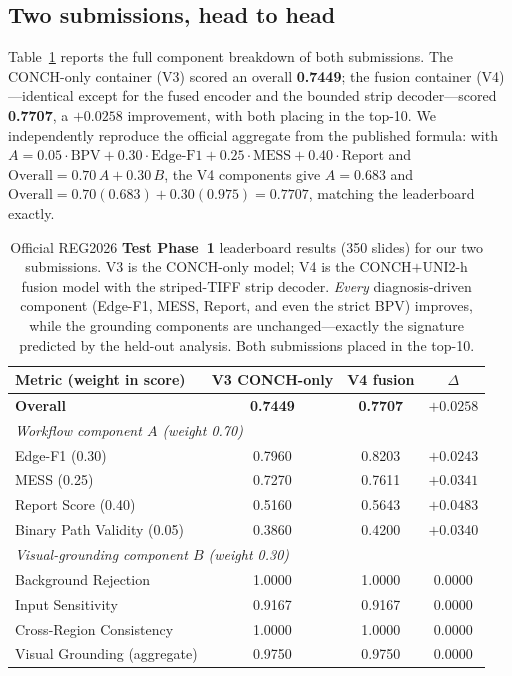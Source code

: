 \documentclass[11pt,a4paper]{article}
\begin{document}
\subsection{Two submissions, head to head}
Table~\ref{tab:testphase} reports the full component breakdown of both submissions. The CONCH-only
container (V3) scored an overall \textbf{0.7449}; the fusion container (V4)---identical except for
the fused encoder and the bounded strip decoder---scored \textbf{0.7707}, a $+0.0258$ improvement,
with both placing in the top-10. We independently reproduce the official aggregate from the
published formula: with $A=0.05\cdot\text{BPV}+0.30\cdot\text{Edge-F1}+0.25\cdot\text{MESS}
+0.40\cdot\text{Report}$ and $\text{Overall}=0.70\,A+0.30\,B$, the V4 components give
$A=0.683$ and $\text{Overall}=0.70(0.683)+0.30(0.975)=0.7707$, matching the leaderboard exactly.

\begin{table}[h]
\centering
\caption{Official REG2026 \textbf{Test Phase~1} leaderboard results (350 slides) for our two
submissions. V3 is the CONCH-only model; V4 is the CONCH$+$UNI2-h fusion model with the striped-TIFF
strip decoder. \emph{Every} diagnosis-driven component (Edge-F1, MESS, Report, and even the strict
BPV) improves, while the grounding components are unchanged---exactly the signature predicted by the
held-out analysis. Both submissions placed in the top-10.}
\label{tab:testphase}
\begin{tabular}{lccc}
\toprule
Metric (weight in score) & V3 CONCH-only & V4 fusion & $\Delta$ \\
\midrule
\textbf{Overall} & \textbf{0.7449} & \textbf{0.7707} & $\mathbf{+0.0258}$ \\
\midrule
\multicolumn{4}{l}{\emph{Workflow component $A$ (weight 0.70)}}\\
\quad Edge-F1 (0.30) & 0.7960 & 0.8203 & $+0.0243$ \\
\quad MESS (0.25)    & 0.7270 & 0.7611 & $+0.0341$ \\
\quad Report Score (0.40) & 0.5160 & 0.5643 & $+0.0483$ \\
\quad Binary Path Validity (0.05) & 0.3860 & 0.4200 & $+0.0340$ \\
\midrule
\multicolumn{4}{l}{\emph{Visual-grounding component $B$ (weight 0.30)}}\\
\quad Background Rejection & 1.0000 & 1.0000 & $0.0000$ \\
\quad Input Sensitivity   & 0.9167 & 0.9167 & $0.0000$ \\
\quad Cross-Region Consistency & 1.0000 & 1.0000 & $0.0000$ \\
\quad Visual Grounding (aggregate) & 0.9750 & 0.9750 & $0.0000$ \\
\bottomrule
\end{tabular}
\end{table}
\end{document}
